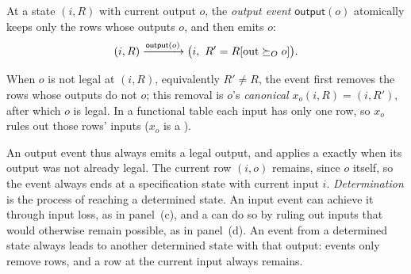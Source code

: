 \begin{definition}
\label{def:output-event}
At a state $(i,R)$ with current output $o$, the \emph{output event}
$\mathsf{output}(o)$ atomically keeps only the rows whose outputs \outrelbase $o$,
and then emits $o$:
\begin{equation}
  (i,R)\xrightarrow{\mathsf{output}(o)}\bigl(i,\ R' = R[\mathrm{out}\succeq_O o]\bigr).
  \label{eq:output-action}
\end{equation}
\end{definition}

\begin{definition}
\label{def:canonical-commitment-functional}
When $o$ is not legal at $(i,R)$, equivalently $R'\neq R$, the event first
removes the rows whose outputs do not \outrelbase $o$; this removal is
$o$'s \emph{canonical \commitment} $x_o(i,R)=(i,R')$, after which $o$ is legal.  In a functional table each
input has only one row, so $x_o$ rules out those rows' inputs ($x_o$ is a \commitment).
\end{definition}

An output event thus always emits a legal output, and applies a \commitment
exactly when its output was not already legal.  The current row $(i,o)$
remains, since $o$ \outrel itself, so the event always ends at a specification
state with current input $i$.  \emph{Determination} is the process of reaching
a determined state.  An input event can achieve it through input loss, as in
panel~(c), and a \commitment can do so by ruling out inputs that would
otherwise remain possible, as in panel~(d).  An event from a determined state
always leads to another determined state with that output: events only
remove rows, and a row at the current input always remains.

